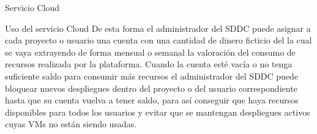 \begin{subsection}{Servicio Cloud}
\begin{subsubsection}{Uso del servicio Cloud}
        De esta forma el administrador del SDDC puede asignar a cada proyecto o usuario una cuenta con una cantidad de dinero ficticio del la cual se vaya extrayendo de forma mensual o semanal la valoración del consumo de recursos realizada por la plataforma. Cuando la cuenta esté vacía o no tenga suficiente saldo para consumir más recursos el administrador del SDDC puede bloquear nuevos despliegues dentro del proyecto o del usuario correspondiente hasta que su cuenta vuelva a tener saldo, para así conseguir que haya recursos disponibles para todos los usuarios y evitar que se mantengan despliegues activos cuyas VMs no están siendo usadas.

    \end{subsubsection}


\end{subsection}
